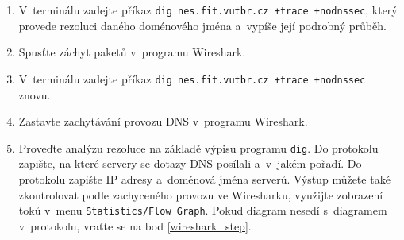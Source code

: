 \documentclass[a4paper,11pt]{article}
\begin{document}
\begin{enumerate}

  \item V~terminálu zadejte příkaz \texttt{dig nes.fit.vutbr.cz +trace +nodnssec}, který provede rezoluci daného doménového jména a~vypíše její podrobný průběh.

  \item \label{wireshark_step} Spusťte záchyt paketů v~programu Wireshark.

  \item V~terminálu zadejte příkaz \texttt{dig nes.fit.vutbr.cz +trace +nodnssec} znovu.

  \item Zastavte zachytávání provozu DNS v~programu Wireshark.

  \item Proveďte analýzu rezoluce na základě výpisu programu {\tt dig}. Do protokolu zapište, na které servery se dotazy DNS posílali a~v~jakém pořadí. Do protokolu zapište IP adresy a~doménová jména serverů. Výstup můžete také zkontrolovat podle zachyceného provozu ve Wiresharku, využijte zobrazení toků v~menu {\tt Statistics/Flow Graph}. Pokud diagram nesedí s~diagramem v~protokolu, vraťte se na bod \ref{wireshark_step}.


\end{enumerate}
\end{document}
